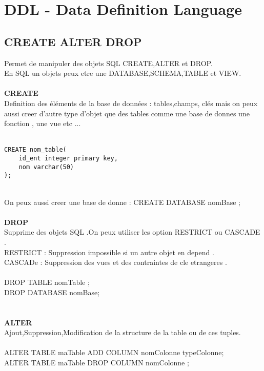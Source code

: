 \documentclass[a4paper,12pt,openany]{book}
\begin{document}

\chapter{DDL - Data Definition Language}
\section{CREATE ALTER DROP}
Permet de manipuler des objets SQL CREATE,ALTER et DROP.\\
En SQL un objets peux etre une DATABASE,SCHEMA,TABLE et VIEW.\\
\\
\textbf{CREATE}\\
Definition des éléments de la base de données : tables,champs, clés mais on peux aussi creer d'autre type d'objet que des tables comme une base de donnes une fonction , une vue etc ... \\
\\
\begin{verbatim}
CREATE nom_table(
	id_ent integer primary key,
	nom varchar(50)
);
\end{verbatim}
\\
On peux aussi creer une base de donne : CREATE DATABASE nomBase ;\\
\\
\textbf{DROP}\\
Supprime des objets SQL .On peux utiliser les option RESTRICT ou CASCADE .\\
RESTRICT : Suppression impossible si un autre objet en depend .\\
CASCADe : Suppression des vues et des contraintes de cle etrangeres .\\
\\
DROP TABLE nomTable ;\\
DROP DATABASE nomBase;\\
\\
\\
\textbf{ALTER}\\
Ajout,Suppression,Modification de la structure de la table ou de ces tuples.\\
\\
ALTER TABLE maTable ADD COLUMN nomColonne typeColonne;\\
ALTER TABLE maTable DROP COLUMN nomColonne ;\\
\\
\\
\end{document}
